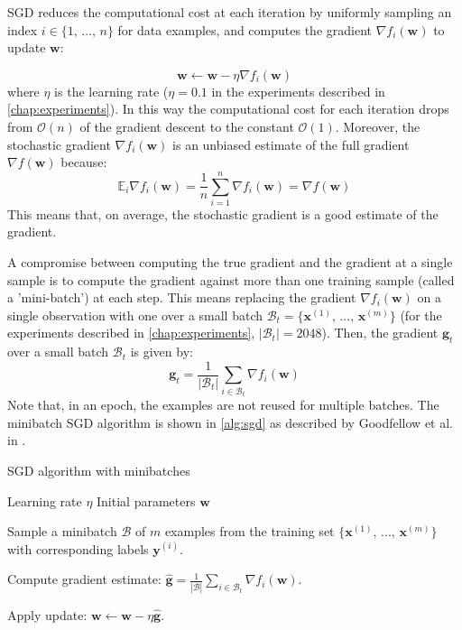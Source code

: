 SGD reduces the computational cost at each iteration by uniformly sampling an index $i \in \{ 1, \, ..., \, n\}$ for data examples, and computes the gradient $\nabla f_i (\textbf{w})$ to update $\textbf{w}$:

\begin{equation}
    \textbf{w} \leftarrow \textbf{w} - \eta \nabla f_i(\textbf{w})
\end{equation}
where $\eta$ is the learning rate ($\eta = 0.1$ in the experiments described in \autoref{chap:experiments}). In this way the computational cost for each iteration drops from $\mathcal{O}(n)$ of the gradient descent to the constant $\mathcal{O}(1)$. Moreover, the stochastic gradient $\nabla f_i(\textbf{w})$ is an unbiased estimate of the full gradient $\nabla f(\textbf{w})$ because:
\begin{equation}
    \mathbb{E}_i \nabla f_i(\mathbf{w}) = \frac{1}{n} \sum_{i = 1}^n \nabla f_i(\mathbf{w}) = \nabla f(\mathbf{w})
\end{equation}
This means that, on average, the stochastic gradient is a good estimate of the gradient.

A compromise between computing the true gradient and the gradient at a single sample is to compute the gradient against more than one training sample (called a 'mini-batch') at each step. This means replacing the gradient $\nabla f_i(\textbf{w})$ on a single observation with one over a small batch $\mathcal{B}_t = \{ \textbf{x}^{(1)},\, ..., \, \textbf{x}^{(m)}\}$ (for the experiments described in \autoref{chap:experiments}, $|\mathcal{B}_t| = 2048$). Then, the gradient $\textbf{g}_t$ over a small batch $\mathcal{B}_t$ is given by:
\begin{equation}
    \mathbf{g}_t = \frac{1}{|\mathcal{B}_t|} \sum_{i \in \mathcal{B}_t} \nabla f_i(\mathbf{w})
\end{equation}
Note that, in an epoch, the examples are not reused for multiple batches. The minibatch SGD algorithm is shown in \autoref{alg:sgd} as described by Goodfellow et al. in \cite{Goodfellow-et-al-2016}.


\begin{algorithm}
    \caption{SGD algorithm with minibatches}\label{alg:sgd}
    \begin{algorithmic}
        \Require Learning rate $\eta$
        \Require Initial parameters $\textbf{w}$
        
        
        Sample a minibatch $\mathcal{B}$ of $m$ examples from the training set $\{ \textbf{x}^{(1)},\, ..., \, \textbf{x}^{(m)}\}$ with corresponding labels $\textbf{y}^{(i)}$.

    Compute gradient estimate: $\hat{\mathbf{g}} = \frac{1}{|\mathcal{B}|} \sum_{i \in \mathcal{B}_t} \nabla f_i(\mathbf{w})$.

    Apply update: $\textbf{w} \leftarrow \textbf{w} - \eta \hat{\mathbf{g}}$.

    \EndWhile
    \end{algorithmic}
    \end{algorithm}


